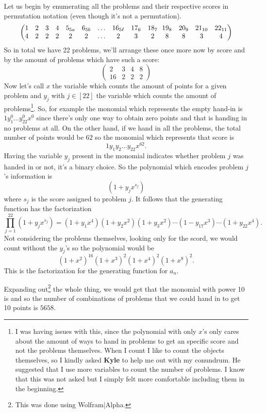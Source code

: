 \documentclass[12pt]{memoir}
\begin{document}
\begin{ptcbr}
Let us begin by enumerating all the problems and their respective scores in permutation notation (even though it's not a permutation).
$$
\left(
\begin{matrix}
    1&2&3&4&5_{5a}&6_{5b}&\dots&16_{5\ell}& 17_6 & 18_7 \\
    4&2&2&2&2&2&\dots&2& 3 & 2 
\end{matrix}\hspace{0.67em}
\begin{matrix}
    19_8&20_9&21_{10}&22_{11}\\
    8&8&3&4
\end{matrix}
\right)
$$
So in total we have 22 problems, we'll arrange these once more now by score and by the amount of problems which have such a score:
$$
\begin{pmatrix}
    2&3&4&8\\
    16&2&2&2
\end{pmatrix}
$$
Now let's call $x$ the variable which counts the amount of points for a given problem and $y_j$ with $j\in[22]$ the variable which counts the amount of problems\footnote{I was having issues with this, since the polynomial with only $x$'s only cares about the amount of ways to hand in problems to get an specific score and not the problems themselves. When I count I like to count the objects themselves, so I kindly asked \textbf{Kyle} to help me out with my conundrum. He suggested that I use more variables to count the number of problems. I know that this was not asked but I simply felt more comfortable including them in the beginning.}. So, for example the monomial which represents the empty hand-in is $1y_1^0\dots y_{22}^0x^0$ since there's only one way to obtain zero points and that is handing in no problems at all. On the other hand, if we hand in all the problems, the total number of points would be $62$ so the monomial which represents that score is 
$$1y_1y_2\dots y_{22}x^{62}.$$
Having the variable $y_j$ present in the monomial indicates whether problem $j$ was handed in or not, it's a binary choice. So the polynomial which encodes problem $j$'s information is 
$$(1+y_jx^{s_j})$$
where $s_j$ is the score assigned to problem $j$. It follows that the generating function has the factorization
$$\prod_{j=1}^{22}(1+y_jx^{s_j})=(1+y_1x^4)(1+y_2x^2)(1+y_3x^2)\cdots(1-y_{17}x^3)\cdots(1+y_{22}x^4).$$
Not considering the problems themselves, looking only for the scord, we would count without the $y_j$'s so the polynomial would be
$$(1+x^2)^{16}(1+x^3)^2(1+x^4)^2(1+x^8)^2.$$
This is the factorization for the generating function for $a_n$.\par 
Expanding out\footnote{This was done using Wolfram|Alpha.} the whole thing, we would get that the monomial with power 10 is  and so the number of combinations of problems that we could hand in to get 10 points is $5658$.
\end{ptcbr}
\end{document}
